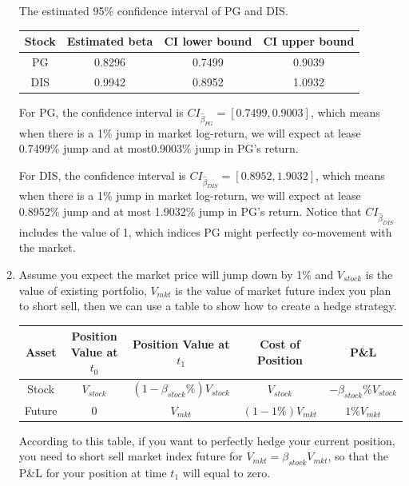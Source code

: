\documentclass[12pt,letterpaper]{article}
\begin{document}
\begin{enumerate}[label=\textbf{(\Alph*)}]
The estimated 95\% confidence interval of PG and DIS.
\begin{table}[ht]
	\centering %
	\begin{tabular}{cccc} %
		\hline\hline %
		Stock& Estimated beta & CI lower bound &CI upper bound\\
		\hline %
		PG&0.8296&0.7499 & 0.9039\\
		DIS&0.9942&0.8952&1.0932\\ %
		\hline %
	\end{tabular}
\end{table}

For PG, the confidence interval is $CI_{\hat{\beta}_{PG}}=[0.7499,	0.9003]$, which means when there is a 1\% jump in market log-return, we will expect at lease 0.7499\% jump and at most0.9003\% jump in PG's return.

For DIS, the confidence interval is $CI_{\hat{\beta}_{DIS}}=[0.8952,	1.9032]$, which means when there is a 1\% jump in market log-return, we will expect at lease 0.8952\% jump and at most 1.9032\% jump in PG's return. Notice that $CI_{\hat{\beta}_{DIS}}$ includes the value of 1, which indices PG might perfectly co-movement with the market.

	
\item  Assume you expect the market price will jump down by 1\% and $V_{stock}$ is the value of existing portfolio, $V_{mkt}$ is the value of market future index you plan to short sell, then we can use a table to show how to create a hedge strategy.
\begin{table}[ht]
	\centering %
	\begin{tabular}{c|c|c|c|c} %
		\hline\hline %
		Asset& Position Value at $t_0$  & Position Value at $t_1$ &Cost of Position& P\&L\\
		\hline %
		Stock&$V_{stock}$&$(1-\beta_{stock}\%)V_{stock}$ & $V_{stock}$ & $-\beta_{stock}\%V_{stock}$\\
		\hline
		Future&0&$V_{mkt}$&$(1-1\%)V_{mkt}$&$1\%V_{mkt}$\\ %
		\hline %
	\end{tabular}
\end{table}

According to this table, if you want to perfectly hedge your current position, you need to short sell market index future for $V_{mkt}=\beta_{stock}V_{mkt}$, so that the P\&L for your position at time $t_1$ will equal to zero.\\


\end{enumerate}
\end{document}
